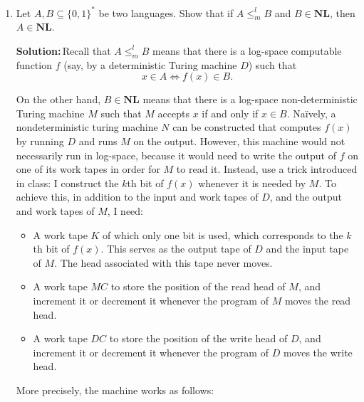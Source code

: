 \documentclass{amsart}
\theoremstyle{plain}
\theoremstyle{definition}
\newcommand{\nl}{\textbf{NL}}
\newcommand{\sol}{\textbf{Solution:\,}}
\begin{document}
\begin{enumerate}[label=\textbf{Exercise \arabic*:}, leftmargin=0cm, labelwidth=-0.2cm, align=left]
        \item
            Let $A, B \subseteq \{0, 1\}^*$ be two languages.
            Show that if $A \leq_m^l B$ and $B \in \nl$, then $A \in \nl$.

            \sol Recall that $A \leq_m^l B$ means that there is a log-space computable function $f$
            (say, by a deterministic Turing machine $D$) such that
            \begin{equation}
                x \in A \iff f(x) \in B.
                \label{eq:logspace}
            \end{equation}

            On the other hand, $B \in \nl$ means that there is a log-space non-deterministic Turing machine $M$
            such that $M$ accepts $x$ if and only if $x \in B$.
            Naïvely, a nondeterministic turing machine $N$ can be constructed that computes $f(x)$ by running $D$ and runs $M$ on the output.
            However, this machine would not necessarily run in log-space, because it would need to write the output of $f$ on one of its
            work tapes in order for $M$ to read it.
            Instead, use a trick introduced in class: I construct the $k$th bit of $f(x)$ whenever it is needed by $M$.
            To achieve this, in addition to the input and work tapes of $D$, and the output and work tapes of $M$, I need:
            \begin{itemize}
                \item A work tape $K$ of which only one bit is used, which corresponds to the $k$th bit of $f(x)$.
                This serves as the output tape of $D$ and the input tape of $M$.
                The head associated with this tape never moves.

                \item A work tape $MC$ to store the position of the read head of $M$, and increment it or decrement it
                whenever the program of $M$ moves the read head.

                \item A work tape $DC$ to store the position of the write head of $D$, and increment it or decrement it
                whenever the program of $D$ moves the write head.
            \end{itemize}

            More precisely, the machine works as follows:


\end{enumerate}
\end{document}
